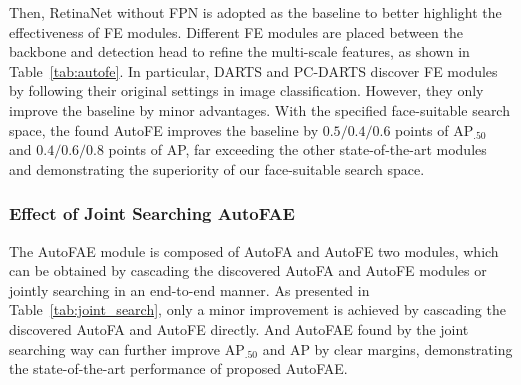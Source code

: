 \documentclass[sigconf]{acmart}
\begin{document}
Then, RetinaNet without FPN is adopted as the baseline to better highlight the effectiveness of FE modules. 
Different FE modules are placed between the backbone and detection head to refine the multi-scale features, as shown in Table~\ref{tab:autofe}. In particular, DARTS and PC-DARTS discover FE modules by following their original settings in image classification. However, they only improve the baseline by minor advantages.
With the specified face-suitable search space, the found AutoFE improves the baseline by $0.5/0.4/0.6$ points of AP$_{.50}$ and $0.4/0.6/0.8$ points of AP, far exceeding the other state-of-the-art modules and demonstrating the superiority of our face-suitable search space.


\subsubsection{Effect of Joint Searching AutoFAE}
The AutoFAE module is composed of AutoFA and AutoFE two modules, which can be obtained by cascading the discovered AutoFA and AutoFE modules or jointly searching in an end-to-end manner. 
As presented in Table~\ref{tab:joint_search}, only a minor improvement is achieved by cascading the discovered AutoFA and AutoFE directly. And AutoFAE found by the joint searching way can further improve AP$_{.50}$ and AP by clear margins, demonstrating the state-of-the-art performance of proposed AutoFAE.



\begin{table}[!t]
    \centering
    \caption{The effect of searching method for the AutoFAE.}
    \label{tab:joint_search}
\end{table}
\end{document}
